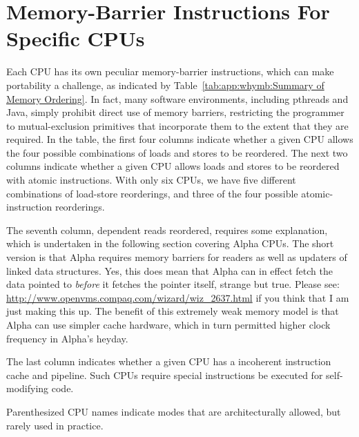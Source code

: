 \section{Memory-Barrier Instructions For Specific CPUs}
\label{sec:app:whymb:Memory-Barrier Instructions For Specific CPUs}

Each CPU has its own peculiar memory-barrier instructions, which
can make portability a challenge, as indicated by
Table~\ref{tab:app:whymb:Summary of Memory Ordering}.
In fact, many software environments,
including pthreads and Java, simply prohibit
direct use of memory barriers, restricting the programmer to mutual-exclusion
primitives that incorporate them to the extent that they are required.
In the table,
the first four columns indicate whether a given CPU allows the four
possible combinations of loads and stores to be reordered.
The next two columns indicate whether a given CPU allows loads and stores
to be reordered with atomic instructions.
With only six CPUs, we have five different combinations of load-store
reorderings, and three of the four possible atomic-instruction
reorderings.

The seventh column, dependent reads reordered, requires some explanation,
which is undertaken in the following section covering Alpha CPUs.
The short version is that Alpha requires memory barriers for readers
as well as updaters of linked data structures.
Yes, this does mean that Alpha can in effect fetch
the data pointed to {\em before} it fetches the pointer itself, strange
but true.
Please see:
\url{http://www.openvms.compaq.com/wizard/wiz_2637.html}
if you think that I am just making this up.
The benefit of this extremely weak memory model is that Alpha can use
simpler cache hardware, which in turn permitted higher clock frequency
in Alpha's heyday.

The last column indicates whether a given CPU has a incoherent
instruction cache and pipeline.
Such CPUs require special instructions be executed for self-modifying
code.

Parenthesized CPU names indicate modes that are architecturally allowed,
but rarely used in practice.

